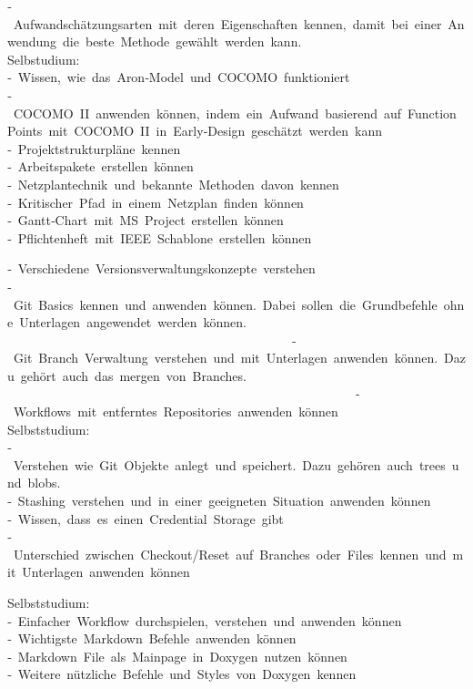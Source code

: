‐ Aufwandschätzungsarten mit deren Eigenschaften kennen, damit bei einer Anwendung die beste Methode gewählt werden kann. \\
Selbstudium: \\
‐ Wissen, wie das Aron‐Model und COCOMO funktioniert \\
‐ COCOMO II anwenden können, indem ein Aufwand basierend auf Function Points mit COCOMO II in Early‐Design geschätzt werden kann \\

‐ Projektstrukturpläne kennen \\
‐ Arbeitspakete erstellen können \\
‐ Netzplantechnik und bekannte Methoden davon kennen \\
‐ Kritischer Pfad in einem Netzplan finden können \\
‐ Gantt‐Chart mit MS Project erstellen können \\

‐ Pflichtenheft mit IEEE Schablone erstellen können 

‐ Verschiedene Versionsverwaltungskonzepte verstehen \\
‐ Git Basics kennen und anwenden können. Dabei sollen die Grundbefehle ohne Unterlagen angewendet werden können.                    \\                                            
‐ Git Branch Verwaltung verstehen und mit Unterlagen anwenden können. Dazu gehört auch das mergen von Branches. \\                                                      
‐ Workflows mit entferntes Repositories anwenden können \\
Selbststudium: \\
‐ Verstehen wie Git Objekte anlegt und speichert. Dazu gehören auch trees und blobs. \\
‐ Stashing verstehen und in einer geeigneten Situation anwenden können \\
‐ Wissen, dass es einen Credential Storage gibt \\
‐ Unterschied zwischen Checkout/Reset auf Branches oder Files kennen und mit Unterlagen anwenden können

Selbststudium: \\
‐ Einfacher Workflow durchspielen, verstehen und anwenden können \\
‐ Wichtigste Markdown Befehle anwenden können \\
‐ Markdown File als Mainpage in Doxygen nutzen können \\
‐ Weitere nützliche Befehle und Styles von Doxygen kennen

